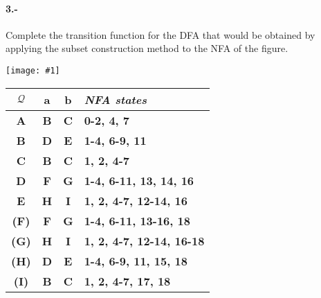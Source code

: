 \documentclass[11pt,a4paper,table,answers]{exam} %
\newcommand{\h}[1]{\ifprintanswers\textcolor{azul}{\bf#1}\else{\phantom{\bf#1}}\fi}
\newcommand{\myincludegraphics}[1]{%
\begin{center}
\begin{adjustbox}{max size={\textwidth}{\textheight}}
    \texttt{[image: \#1]}
\end{adjustbox}
\end{center}
} %
\begin{document}
\paragraph{3.-}\label{p3}
Complete the transition function for the DFA that would be obtained by applying the subset construction method to the NFA of the figure.
    \myincludegraphics{}
\begin{tabular} {c@{\hspace{4mm}}cc@{\hspace{4mm}}l}
\toprule %
$\mathcal{Q}$ & a & b & \emph{NFA states}\\
\midrule %
\h{A} & \h{B} & \h{C} & \h{0-2, 4, 7}\\
\h{B} & \h{D} & \h{E} & \h{1-4, 6-9, 11}\\
\h{C} & \h{B} & \h{C} & \h{1, 2, 4-7}\\
\h{D} & \h{F} & \h{G} & \h{1-4, 6-11, 13, 14, 16}\\
\h{E} & \h{H} & \h{I} & \h{1, 2, 4-7, 12-14, 16}\\
\h{(F)} & \h{F} & \h{G} & \h{1-4, 6-11, 13-16, 18}\\
\h{(G)} & \h{H} & \h{I} & \h{1, 2, 4-7, 12-14, 16-18}\\
\h{(H)} & \h{D} & \h{E} & \h{1-4, 6-9, 11, 15, 18}\\
\h{(I)} & \h{B} & \h{C} & \h{1, 2, 4-7, 17, 18}\\
\bottomrule %
\end{tabular}
\end{document}
